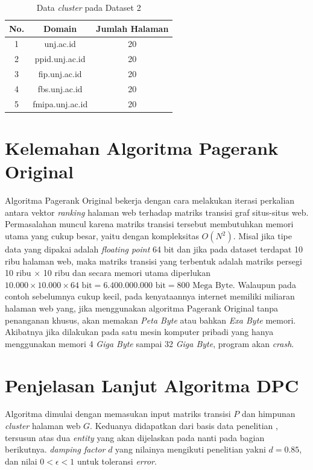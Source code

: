 \begin{longtable}{|c|c|c|}
\caption{Data \textit{cluster} pada Dataset 2}
\label{domain:dataset2} \\
\hline
\textbf{No.} & \textbf{Domain} & \textbf{Jumlah Halaman} \\
\hline
1 & unj.ac.id & 20 \\
2 & ppid.unj.ac.id & 20 \\
3 & fip.unj.ac.id & 20 \\
4 & fbs.unj.ac.id & 20 \\
5 & fmipa.unj.ac.id & 20 \\
\hline
\end{longtable}

\section{Kelemahan Algoritma Pagerank Original}

Algoritma Pagerank Original bekerja dengan cara melakukan iterasi perkalian antara vektor \textit{ranking} halaman web terhadap matriks transisi graf situs-situs web. Permasalahan muncul karena matriks transisi tersebut membutuhkan memori utama yang cukup besar, yaitu dengan kompleksitas $O(N^2)$. Misal jika tipe data yang dipakai adalah \textit{floating point} 64 bit dan jika pada dataset terdapat 10 ribu halaman web, maka matriks transisi yang terbentuk adalah matriks persegi 10 ribu $\times$ 10 ribu dan secara memori utama diperlukan $10.000 \times 10.000 \times 64 \text{ bit} = 6.400.000.000 \text{ bit} = 800 \text{ Mega Byte}$. Walaupun pada contoh sebelumnya cukup kecil, pada kenyataannya internet memiliki miliaran halaman web yang, jika menggunakan algoritma Pagerank Original tanpa penanganan khusus, akan memakan \textit{Peta Byte} atau bahkan \textit{Exa Byte} memori. Akibatnya jika dilakukan pada satu mesin komputer pribadi yang hanya menggunakan memori 4 \textit{Giga Byte} sampai 32 \textit{Giga Byte}, program akan \textit{crash}.

\section{Penjelasan Lanjut Algoritma DPC}

Algoritma dimulai dengan memasukan input matriks transisi $P$ dan himpunan \textit{cluster} halaman web $G$. Keduanya didapatkan dari basis data penelitian \citet{khatulistiwa2022SearchEngine}, tersusun atas dua \textit{entity} yang akan dijelaskan pada nanti pada bagian berikutnya. \textit{damping factor} $d$ yang nilainya mengikuti penelitian \citet{zhuetal2005distributedPagerank} yakni $d=0.85$, dan nilai $0 < \epsilon < 1$ untuk toleransi \textit{error}.

